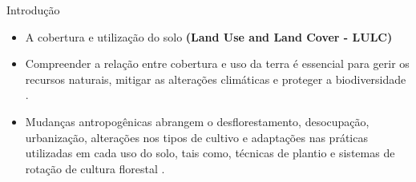\documentclass[%
  10pt,%
  aspectratio = 169,%
  compress,%
  t,%
  english,%
  brazilian,%
  tikz,
]{beamer}
\begin{document}
\begin{frame}{Introdução}
\begin{itemize}
    \item A cobertura e utilização do solo \textbf{(Land Use and Land Cover - LULC)}
    \item Compreender a relação entre cobertura e uso da terra é essencial para gerir os recursos naturais, mitigar as alterações climáticas e proteger a biodiversidade \cite{ZIN; LIN, 2018}.
    \item Mudanças antropogênicas abrangem o desflorestamento, desocupação, urbanização, alterações nos tipos de cultivo e adaptações nas práticas utilizadas em cada uso do solo, tais como, técnicas de plantio e sistemas de rotação de cultura florestal \cite{Peterson et al. (2014)}.
\end{itemize}
\end{frame}
\end{document}
